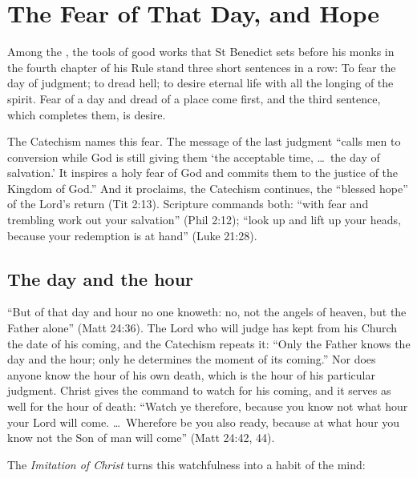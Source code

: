 \section{The Fear of That Day, and Hope}\label{sec:fear}

Among the , the tools of good works that St Benedict sets before his monks in the fourth chapter of his Rule stand three short sentences in a row:  To fear the day of judgment; to dread hell; to desire eternal life with all the longing of the spirit. Fear of a day and dread of a place come first, and the third sentence, which completes them, is desire.

The Catechism names this fear. The message of the last judgment ``calls men to conversion while God is still giving them `the acceptable time, \ldots\ the day of salvation.' It inspires a holy fear of God and commits them to the justice of the Kingdom of God.'' And it proclaims, the Catechism continues, the ``blessed hope'' of the Lord's return (Tit 2:13). Scripture commands both: ``with fear and trembling work out your salvation'' (Phil 2:12); ``look up and lift up your heads, because your redemption is at hand'' (Luke 21:28).

\subsection{The day and the hour}

``But of that day and hour no one knoweth: no, not the angels of heaven, but the Father alone'' (Matt 24:36). The Lord who will judge has kept from his Church the date of his coming, and the Catechism repeats it: ``Only the Father knows the day and the hour; only he determines the moment of its coming.'' Nor does anyone know the hour of his own death, which is the hour of his particular judgment. Christ gives the command to watch for his coming, and it serves as well for the hour of death: ``Watch ye therefore, because you know not what hour your Lord will come. \ldots\ Wherefore be you also ready, because at what hour you know not the Son of man will come'' (Matt 24:42, 44).

The \emph{Imitation of Christ} turns this watchfulness into a habit of the mind:

